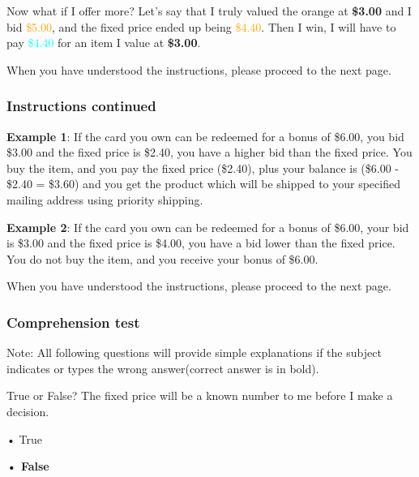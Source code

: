 \documentclass[12pt]{article}
\begin{document}
Now what if I offer more? Let’s say that I truly valued the orange at \textbf{\$3.00} and I bid \textcolor{orange}{\$5.00}, and the fixed price ended up being \textcolor{orange}{\$4.40}. Then I win, I will have to pay \textcolor{cyan}{\$4.40} for an item I value at \textbf{\$3.00}.  

\vspace{0.5cm} 

When you have understood the instructions, please proceed to the next page.  


\clearpage


\subsubsection*{Instructions continued}


\textbf{Example 1}: If the card you own can be redeemed for a bonus of \$6.00, you bid \$3.00 and the fixed price is \$2.40, you have a higher bid than the fixed price. You buy the item, and you pay the fixed price (\$2.40), plus your balance is (\$6.00 - \$2.40 = \$3.60) and you get the product which will be shipped to your specified mailing address using priority shipping.
\vspace{0.5cm}


\textbf{Example 2}: If the card you own can be redeemed for a bonus of \$6.00, your bid is \$3.00 and the fixed price is \$4.00, you have a bid lower than the fixed price. You do not buy the item, and you receive your bonus of \$6.00.

\vspace{0.5cm}

When you have understood the instructions, please proceed to the next page.
\clearpage


\subsubsection*{Comprehension test}
Note: All following questions will provide simple explanations if the subject indicates or types the wrong answer(correct answer is in bold).

\vspace{0.5cm}

True or False? The fixed price will be a known number to me before I make a decision.  

• True  \par
\textbf{• False}\par  

\vspace{0.5cm}
\end{document}
